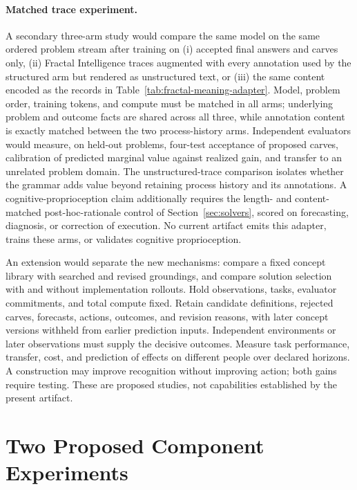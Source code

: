 \documentclass[10pt]{article}
\begin{document}
\paragraph{Matched trace experiment.}
A secondary three-arm study would compare the same model on the same ordered
problem stream after training on (i) accepted final answers and carves only,
(ii) Fractal Intelligence traces augmented with every annotation used by the
structured arm but rendered as unstructured text, or (iii) the same content
encoded as the records in Table~\ref{tab:fractal-meaning-adapter}. Model,
problem order, training tokens, and compute must be matched in all arms;
underlying problem and outcome facts are shared across all three, while
annotation content is exactly matched between the two process-history arms.
Independent evaluators would measure, on held-out problems, four-test acceptance
of proposed carves, calibration of predicted marginal value against realized
gain, and transfer to an unrelated problem domain. The unstructured-trace
comparison isolates whether the grammar adds value beyond retaining process
history and its annotations. A cognitive-proprioception claim additionally
requires the length- and content-matched post-hoc-rationale control of
Section~\ref{sec:solvers}, scored on forecasting, diagnosis, or correction of
execution. No current artifact emits this adapter, trains these arms, or
validates cognitive proprioception.

An extension would separate the new mechanisms: compare a fixed concept
library with searched and revised groundings, and compare solution selection
with and without implementation rollouts. Hold observations, tasks, evaluator
commitments, and total compute fixed. Retain candidate definitions, rejected
carves, forecasts, actions, outcomes, and revision reasons, with later concept
versions withheld from earlier prediction inputs. Independent environments or
later observations must supply the decisive outcomes. Measure task performance,
transfer, cost, and prediction of effects on different people over declared
horizons. A construction may improve recognition without improving action;
both gains require testing. These are proposed studies, not capabilities
established by the present artifact.

\section{Two Proposed Component Experiments}
\label{sec:component-experiments}
\end{document}
